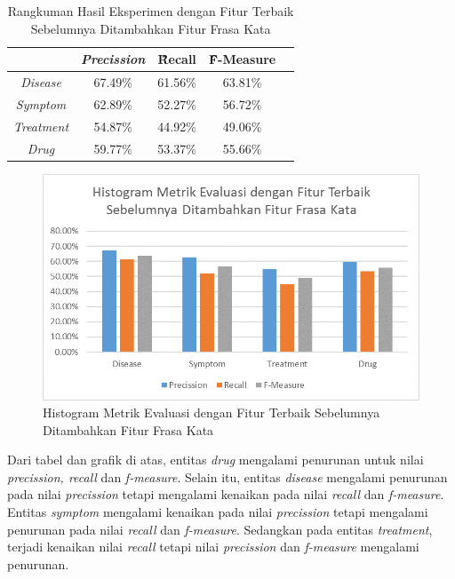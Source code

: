 	\begin{table}
		\centering
		\caption{Rangkuman Hasil Eksperimen dengan Fitur Terbaik Sebelumnya Ditambahkan Fitur Frasa Kata}
		\begin{tabular}{|c|c|c|c|c|}
			\hline
			                      & \textit{Precission} & \f{\f{Recall}} & \f{\f{F-Measure}} \\ \hline
			\textit{Disease}      & 67.49\%             & 61.56\%        & 63.81\%           \\ \hline
			\textit{Symptom}      & 62.89\%             & 52.27\%        & 56.72\%           \\ \hline
			\textit{Treatment}    & 54.87\%             & 44.92\%        & 49.06\%           \\ \hline
			\textit{Drug}		  & 59.77\%             & 53.37\%        & 55.66\%           \\ \hline
		\end{tabular}
		\label{table:owndict5}
	\end{table}

	\begin{figure}
		\centering
		\includegraphics[width=0.85\linewidth]{images/histogram5}
		\caption{Histogram Metrik Evaluasi dengan Fitur Terbaik Sebelumnya Ditambahkan Fitur Frasa Kata}
		\label{fig:owndict5}
	\end{figure}

	Dari tabel dan grafik di atas, entitas \textit{drug} mengalami penurunan untuk nilai \textit{precission, recall} dan \textit{f-measure}. Selain itu, entitas \textit{disease} mengalami penurunan pada nilai \textit{precission} tetapi mengalami kenaikan pada nilai \textit{recall} dan \textit{f-measure}. Entitas \textit{symptom} mengalami kenaikan pada nilai \textit{precission} tetapi mengalami penurunan pada nilai \textit{recall} dan \textit{f-measure}. Sedangkan pada entitas \textit{treatment}, terjadi kenaikan nilai \textit{recall} tetapi nilai \textit{precission} dan \textit{f-measure} mengalami penurunan. 
	
